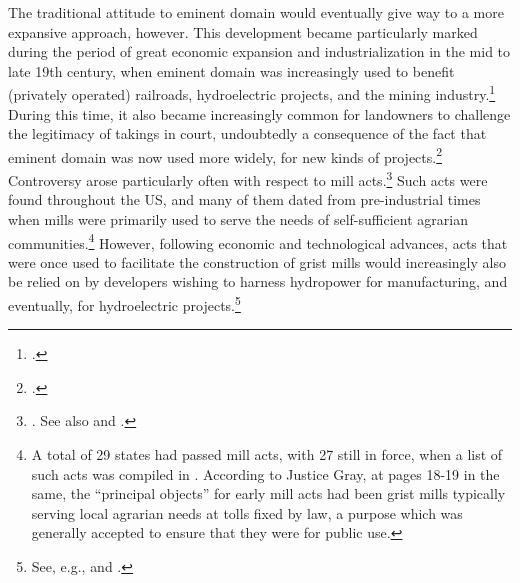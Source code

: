 \documentclass[12pt,a4paper]{book} %
\begin{document}

The traditional attitude to eminent domain would eventually give way to a more expansive approach, however. This development became particularly marked during the period of great economic expansion and industrialization in the mid to late 19th century, when eminent domain was increasingly used to benefit (privately operated) railroads, hydroelectric projects, and the mining industry.\footcite[23-33]{meidinger80} During this time, it also became increasingly common for landowners to challenge the legitimacy of takings in court, undoubtedly a consequence of the fact that eminent domain was now used more widely, for new kinds of projects.\footcite[24]{meidinger80} Controversy arose particularly often with respect to mill acts.\footnote{\cite[24]{meidinger80}. See also \cite[306-313]{johnson11} and \cite[251-252]{horwitz73}.} Such acts were found throughout the US, and many of them dated from pre-industrial times when mills were primarily used to serve the needs of self-sufficient agrarian communities.\footnote{A total of 29 states had passed mill acts, with 27 still in force, when a list of such acts was compiled in \cite[17]{head85}. According to Justice Gray, at pages 18-19 in the same, the ``principal objects'' for early mill acts had been grist mills typically serving local agrarian needs at tolls fixed by law, a purpose which was generally accepted to ensure that they were for public use.}  However, following economic and technological advances, acts that were once used to facilitate the construction of grist mills would increasingly also be relied on by developers wishing to harness hydropower for manufacturing, and eventually, for hydroelectric projects.\footnote{See, e.g., \cite[18-21]{head85} and \cite[449-452]{minn06}.}
\end{document}

